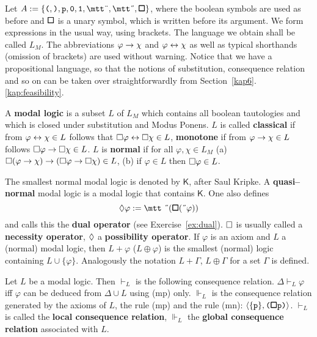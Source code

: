 \index{$\qu, \wD$}%
Let $A := \{\mbox{\tt (}, \mbox{\tt )}, \mbox{\tt p}, \mbox{\tt 0},
\mbox{\tt 1}, \mbox{\mtt\symbol{4}}, \mbox{\mtt\symbol{5}}, 
\boldsymbol{\qu}\}$, where the boolean symbols are used as before 
and $\boldsymbol{\square}$ is a unary symbol, which is written before 
its argument. We form expressions in the usual way, using brackets. 
The language we obtain shall be called $L_M$. The abbreviations 
$\varphi \rightarrow \chi$ and $\varphi\leftrightarrow \chi$ as well as typical 
shorthands (omission of brackets) are used without warning.
Notice that we have a propositional language, so that the notions
of substitution, consequence relation and so on can be taken over
straightforwardly from Section~\ref{kap6}.\ref{kap:feasibility}.
\begin{defn}
A \textbf{modal logic} is a subset $L$ of $L_M$ which contains
all boolean tautologies and which is closed under substitution and
Modus Ponens. $L$ is called \textbf{classical} if from $\varphi
\leftrightarrow \chi \in L$ follows that $\square \varphi \leftrightarrow\square \chi \in
L$, \textbf{monotone} if from $\varphi \rightarrow \chi\in L$
follows $\square \varphi \rightarrow \square \chi \in L$.  $L$ is 
\textbf{normal} if for all $\varphi, \chi \in L_M$ (a) 
$\square (\varphi \rightarrow \chi) \rightarrow (\square \varphi \rightarrow\square\chi) \in L$, 
(b) if $\varphi \in L$ then $\square \varphi \in L$.
\end{defn}
The smallest normal modal logic is denoted by $\mathsf{K}$, after Saul
Kripke. 
A \textbf{quasi--normal} modal logic is a modal logic that
contains $\mathsf{K}$. One also defines
\begin{equation}
\wD \varphi := \mbox{\mtt \symbol{5}($\boldsymbol{\qu}$(\symbol{5}%
$\varphi$))}
\end{equation}
and calls this the \textbf{dual operator} (see Exercise~\ref{ex:dual}). 
$\square$ is usually called a \textbf{necessity operator}, $\lozenge$ a 
\textbf{possibility operator}.
\index{$\oplus$}%
If $\varphi$ is an axiom and $L$ a (normal) modal logic,
then $L + \varphi$ ($L\oplus \varphi$) is the smallest
(normal) logic containing $L \cup \{\varphi\}$. Analogously
the notation $L + \Gamma$, $L \oplus \Gamma$ for a set
$\Gamma$ is defined.
\begin{defn}
Let $L$ be a modal logic. Then $\vdash_{L}$ is the
following consequence relation. $\Delta \vdash_{L} \varphi$
iff $\varphi$ can be deduced from $\Delta \cup L$
using (mp) only. $\Vdash_{L}$ is the consequence
relation generated by the axioms of $L$, the rule (mp) and
the rule (mn): $\langle \{\mbox{\tt p}\}, \mbox{\tt ($\boldsymbol{\square}$p)}\rangle$. 
$\vdash_{L}$ is called the \textbf{local consequence relation}, 
$\Vdash_{L}$ the \textbf{global consequence relation} associated 
with $L$.
\end{defn}
